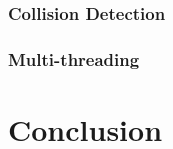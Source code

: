 \documentclass{article}
\begin{document}
\subsubsection{Collision Detection}

\subsubsection{Multi-threading}

\section{Conclusion}
\end{document}
